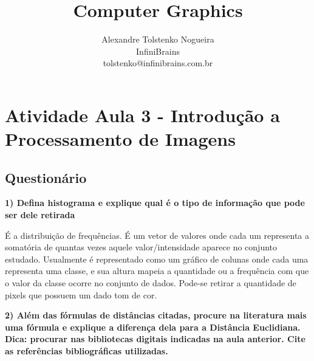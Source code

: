 \documentclass[a4paper]{sbgames}               %
\title{Computer Graphics}
\author{Alexandre Tolstenko Nogueira\\InfiniBrains\\tolstenko@infinibrains.com.br 
}
\begin{document}


\maketitle




\section{Atividade Aula 3 - Introdução a Processamento de Imagens}

\subsection*{Questionário}

\textbf{1) Defina histograma e explique qual é o tipo de informação que pode ser dele retirada}

É a distribuição de frequências. É um vetor de valores onde cada um representa a somatória de quantas vezes aquele valor/intensidade aparece no conjunto estudado. Usualmente é representado como um gráfico de colunas onde cada uma representa uma classe, e sua altura mapeia a quantidade ou a frequência com que o valor da classe ocorre no conjunto de dados. Pode-se retirar a quantidade de pixels que possuem um dado tom de cor.

\textbf{2) Além das fórmulas de distâncias citadas, procure na literatura mais uma fórmula e explique a diferença dela para a Distância Euclidiana. Dica: procurar nas bibliotecas digitais indicadas na aula anterior. Cite as referências bibliográficas
utilizadas.
}
\end{document}
